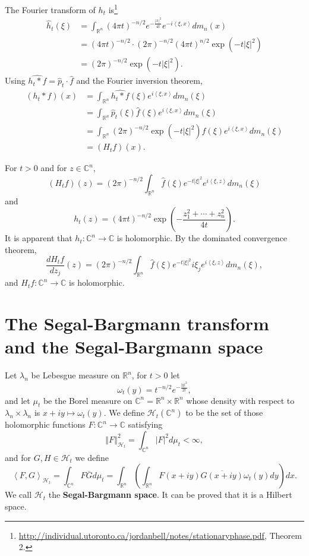 \documentclass{article}
\newcommand{\inner}[2]{\left\langle #1, #2 \right\rangle}
\newcommand{\norm}[1]{\left\Vert #1 \right\Vert}
\theoremstyle{definition}
\begin{document}
The Fourier transform of $h_t$ is\footnote{\url{http://individual.utoronto.ca/jordanbell/notes/stationaryphase.pdf}, 
Theorem 2.}
\begin{align*}
\widehat{h}_t(\xi)&= \int_{\mathbb{R}^n} (4\pi t)^{-n/2}
e^{-\frac{|x|^2}{4t}} e^{-i\inner{\xi}{x}} dm_n(x)\\
&=(4\pi t)^{-n/2} \cdot (2\pi)^{-n/2} (4\pi t)^{n/2} \exp(-t|\xi|^2)\\
&=(2\pi)^{-n/2} \exp(-t|\xi|^2).
\end{align*}
Using $\widehat{h_t*f}= \widehat{p}_t \cdot \widehat{f}$ and the Fourier inversion theorem,
\begin{align*}
(h_t*f)(x)&= \int_{\mathbb{R}^n} \widehat{h_t*f}(\xi)e^{i\inner{\xi}{x}} dm_n(\xi)\\
&=\int_{\mathbb{R}^n} \widehat{p}_t(\xi) \widehat{f}(\xi) e^{i\inner{\xi}{x}} dm_n(\xi)\\
&=\int_{\mathbb{R}^n} (2\pi)^{-n/2} \exp(-t|\xi|^2) \widehat{f}(\xi) e^{i\inner{\xi}{x}} dm_n(\xi)\\
&=(H_t f)(x).
\end{align*}

For $t>0$ and for $z \in \mathbb{C}^n$,
\[
(H_t f)(z) = (2\pi)^{-n/2} \int_{\mathbb{R}^n} \widehat{f}(\xi) e^{-t|\xi|^2} e^{i\inner{\xi}{z}} dm_n(\xi)
\]
and
\[
h_t(z) = (4\pi t)^{-n/2} \exp\left(-\frac{z_1^2+\cdots+z_n^2}{4t}\right).
\]
It is apparent that $h_t:\mathbb{C}^n \to \mathbb{C}$ is holomorphic. 
By the dominated convergence theorem,
\[
\frac{d H_t f}{dz_j} (z) = (2\pi)^{-n/2} \int_{\mathbb{R}^n} \widehat{f}(\xi) e^{-t|\xi|^2} i\xi_j e^{i\inner{\xi}{z}} dm_n(\xi),
\]
and $H_t f:\mathbb{C}^n \to \mathbb{C}$ is holomorphic. 




\section{The Segal-Bargmann transform and the Segal-Bargmann space}
Let $\lambda_n$ be Lebesgue measure on $\mathbb{R}^n$,  
for $t>0$
let
\[
\omega_t(y) = t^{-n/2} e^{-\frac{|y|^2}{2t}},
\]
and
let $\mu_t$ be the Borel measure on $\mathbb{C}^n=\mathbb{R}^n \times \mathbb{R}^n$ whose density with respect to $\lambda_n \times \lambda_n$ is
$x+iy \mapsto \omega_t(y)$. 
We define $\mathcal{H}_t(\mathbb{C}^n)$ to be the set of those holomorphic functions $F:\mathbb{C}^n \to \mathbb{C}$ satisfying
\[
\norm{F}_{\mathcal{H}_t}^2 = \int_{\mathbb{C}^n} |F|^2 d\mu_t<\infty,
\]
and for $G,H \in \mathcal{H}_t$ we define
\[
\inner{F}{G}_{\mathcal{H}_t} = \int_{\mathbb{C}^n} F \overline{G} d\mu_t
=\int_{\mathbb{R}^n} \left( \int_{\mathbb{R}^n} F(x+iy) \overline{G(x+iy)} \omega_t(y) dy \right) dx.
\]
We call $\mathcal{H}_t$ the \textbf{Segal-Bargmann space}. It can be proved that it is a Hilbert space.
\end{document}
